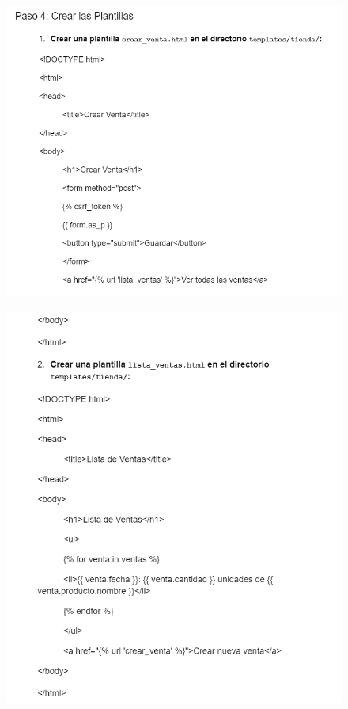 \documentclass{article}
\begin{document}
	\begin{figure}[H]
		\centering
		\includegraphics[width=1.0\textwidth,keepaspectratio]{img/quinto.png}
	\end{figure}
	\begin{figure}[H]
		\centering
		\includegraphics[width=1.0\textwidth,keepaspectratio]{img/sexto.png}
	\end{figure}
\end{document}
